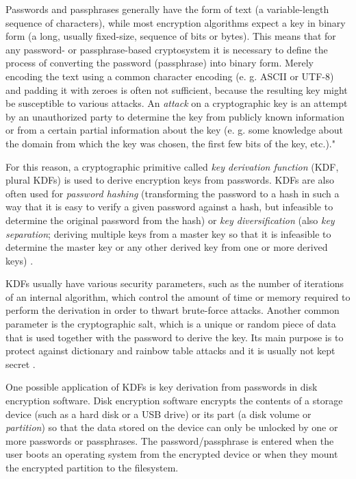\documentclass[12pt,oneside]{fithesis2}
\begin{document}
      Passwords and passphrases generally have the form of text (a variable-length sequence of characters), while most encryption algorithms expect a key in binary form (a long, usually fixed-size, sequence of bits or bytes). This means that for any password- or pass\-phrase-based cryptosystem it is necessary to define the process of converting the password (passphrase) into binary form. Merely encoding the text using a common character encoding (e. g. ASCII or UTF-8) and padding it with zeroes is often not sufficient, because the resulting key might be susceptible to various attacks. An \emph{attack} on a cryptographic key is an attempt by an unauthorized party to determine the key from publicly known information or from a certain partial information about the key (e. g. some knowledge about the domain from which the key was chosen, the first few bits of the key, etc.)."
    
      For this reason, a cryptographic primitive called \emph{key derivation function} (KDF, plural KDFs) is used to derive encryption keys from passwords. KDFs are also often used for \emph{password hashing} (transforming the password to a hash in such a way that it is easy to verify a given password against a hash, but infeasible to determine the original password from the hash) or \emph{key diversification} (also \emph{key separation}; deriving multiple keys from a master key so that it is infeasible to determine the master key or any other derived key from one or more derived keys) \cite{wiki:KDF, nist:sp800:108}.
    
      KDFs usually have various security parameters, such as the number of iterations of an internal algorithm, which control the amount of time or memory required to perform the derivation in order to thwart brute-force attacks. Another common parameter is the cryptographic salt, which is a unique or random piece of data that is used together with the password to derive the key. Its main purpose is to protect against dictionary and rainbow table attacks and it is usually not kept secret \cite{rfc2898}.
      
      \sloppy
      One possible application of KDFs is key derivation from passwords in disk encryption software. Disk encryption software encrypts the contents of a storage device (such as a hard disk or a USB drive) or its part (a disk volume or \emph{partition}) so that the data stored on the device can only be unlocked by one or more passwords or passphrases. The password/passphrase is entered when the user boots an operating system from the encrypted device or when they mount the encrypted partition to the filesystem.
      
\end{document}

